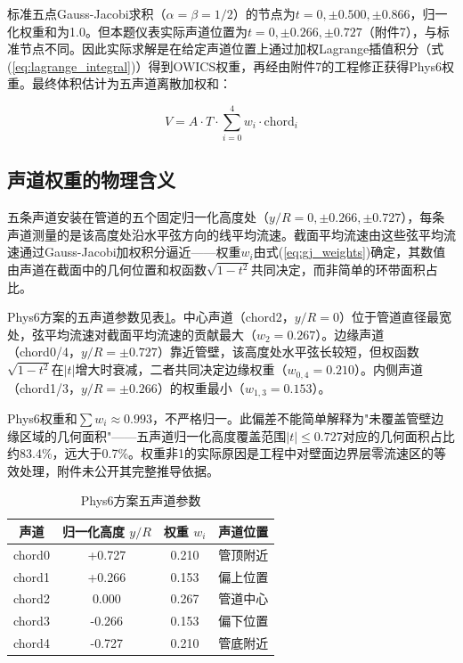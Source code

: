 标准五点Gauss-Jacobi求积（$\alpha=\beta=1/2$）的节点为$t = 0, \pm 0.500, \pm 0.866$，归一化权重和为1.0。但本题仪表实际声道位置为$t = 0, \pm 0.266, \pm 0.727$（附件7），与标准节点不同。因此实际求解是在给定声道位置上通过加权Lagrange插值积分（式(\ref{eq:lagrange_integral})）得到OWICS权重，再经由附件7的工程修正获得Phys6权重。最终体积估计为五声道离散加权和：

\begin{equation}
V = A \cdot T \cdot \sum_{i=0}^{4} w_i \cdot \text{chord}_i
\label{eq:final_model}
\end{equation}

\subsection{声道权重的物理含义}

五条声道安装在管道的五个固定归一化高度处（$y/R = 0, \pm 0.266, \pm 0.727$），每条声道测量的是该高度处沿水平弦方向的线平均流速。截面平均流速由这些弦平均流速通过Gauss-Jacobi加权积分逼近——权重$w_i$由式(\ref{eq:gj_weights})确定，其数值由声道在截面中的几何位置和权函数$\sqrt{1-t^2}$共同决定，而非简单的环带面积占比。

Phys6方案的五声道参数见表\ref{tab:phys6_weights}。中心声道（chord2，$y/R=0$）位于管道直径最宽处，弦平均流速对截面平均流速的贡献最大（$w_2=0.267$）。边缘声道（chord0/4，$y/R=\pm 0.727$）靠近管壁，该高度处水平弦长较短，但权函数$\sqrt{1-t^2}$在$|t|$增大时衰减，二者共同决定边缘权重（$w_{0,4}=0.210$）。内侧声道（chord1/3，$y/R=\pm 0.266$）的权重最小（$w_{1,3}=0.153$）。

Phys6权重和$\sum w_i \approx 0.993$，不严格归一。此偏差不能简单解释为"未覆盖管壁边缘区域的几何面积"——五声道归一化高度覆盖范围$|t| \le 0.727$对应的几何面积占比约83.4\%，远大于0.7\%。权重非1的实际原因是工程中对壁面边界层零流速区的等效处理，附件未公开其完整推导依据。

\begin{table}[H]
\centering
\caption{Phys6方案五声道参数}
\label{tab:phys6_weights}
\begin{tabular}{cccc}
\toprule
声道 & 归一化高度 $y/R$ & 权重 $w_i$ & 声道位置 \\
\midrule
chord0 & +0.727 & 0.210 & 管顶附近 \\
chord1 & +0.266 & 0.153 & 偏上位置 \\
chord2 & 0.000 & 0.267 & 管道中心 \\
chord3 & -0.266 & 0.153 & 偏下位置 \\
chord4 & -0.727 & 0.210 & 管底附近 \\
\bottomrule
\end{tabular}
\end{table}

